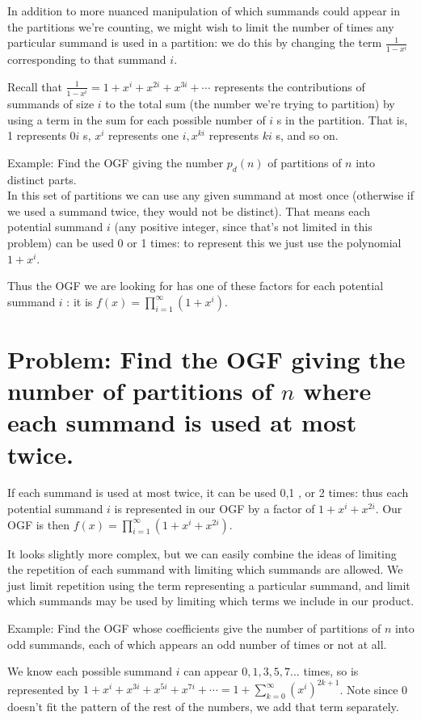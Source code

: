 \documentclass{article}
\theoremstyle{definition}
\begin{document}
In addition to more nuanced manipulation of which summands could appear in the partitions we're counting, we might wish to limit the number of times any particular summand is used in a partition: we do this by changing the term $\frac{1}{1-x^{i}}$ corresponding to that summand $i$.

Recall that $\frac{1}{1-x^{i}}=1+x^{i}+x^{2 i}+x^{3 i}+\cdots$ represents the contributions of summands of size $i$ to the total sum (the number we're trying to partition) by using a term in the sum for each possible number of $i$ s in the partition. That is, 1 represents $0 i$ s, $x^{i}$ represents one $i, x^{k i}$ represents $k i$ s, and so on.

Example: Find the OGF giving the number $p_{d}(n)$ of partitions of $n$ into distinct parts.\\
In this set of partitions we can use any given summand at most once (otherwise if we used a summand twice, they would not be distinct). That means each potential summand $i$ (any positive integer, since that's not limited in this problem) can be used 0 or 1 times: to represent this we just use the polynomial $1+x^{i}$.

Thus the OGF we are looking for has one of these factors for each potential summand $i$ : it is $f(x)=\prod_{i=1}^{\infty}\left(1+x^{i}\right)$.

\section*{Problem: Find the OGF giving the number of partitions of $n$ where each summand is used at most twice.}
If each summand is used at most twice, it can be used 0,1 , or 2 times: thus each potential summand $i$ is represented in our OGF by a factor of $1+x^{i}+x^{2 i}$. Our OGF is then $f(x)=\prod_{i=1}^{\infty}\left(1+x^{i}+x^{2 i}\right)$.

It looks slightly more complex, but we can easily combine the ideas of limiting the repetition of each summand with limiting which summands are allowed. We just limit repetition using the term representing a particular summand, and limit which summands may be used by limiting which terms we include in our product.

Example: Find the OGF whose coefficients give the number of partitions of $n$ into odd summands, each of which appears an odd number of times or not at all.

We know each possible summand $i$ can appear $0,1,3,5,7 \ldots$ times, so is represented by $1+x^{i}+x^{3 i}+x^{5 i}+x^{7 i}+\cdots=1+\sum_{k=0}^{\infty}\left(x^{i}\right)^{2 k+1}$. Note since 0 doesn't fit the pattern of the rest of the numbers, we add that term separately.
\end{document}
